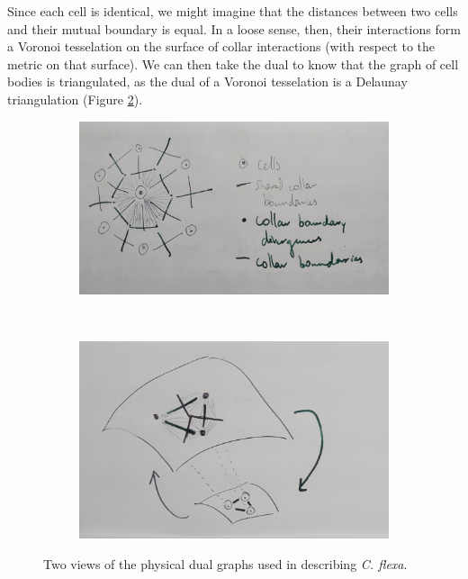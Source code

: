 Since each cell is identical, we might imagine that the distances between two cells and their mutual boundary is equal. In a loose sense, then, their interactions form a Voronoi tesselation on the surface of collar interactions (with respect to the metric on that surface). We can then take the dual to know that the graph of cell bodies is triangulated, as the dual of a Voronoi tesselation is a Delaunay triangulation (Figure \ref{subfig:duals2}).

\begin{figure}[htbp]
    \centering
    \begin{subfigure}[b]{0.52\textwidth}
        \includegraphics[width=\textwidth]{duals1.jpg}
        \caption{}
        \label{subfig:duals1}
    \end{subfigure}
    ~
    \begin{subfigure}[b]{0.46\textwidth}
        \includegraphics[width=\textwidth]{duals2.jpg}
        \caption{}
        \label{subfig:duals2}
    \end{subfigure}
    \caption{Two views of the physical dual graphs used in describing \textit{C. flexa}.}
    \label{fig:duals}
\end{figure}

